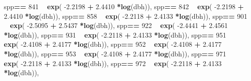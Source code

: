 \documentclass[
]{article}
\newenvironment{Shaded}{\begin{snugshade}}{\end{snugshade}}
\newcommand{\DecValTok}[1]{\textcolor[rgb]{0.00,0.00,0.81}{#1}}
\newcommand{\FloatTok}[1]{\textcolor[rgb]{0.00,0.00,0.81}{#1}}
\newcommand{\KeywordTok}[1]{\textcolor[rgb]{0.13,0.29,0.53}{\textbf{#1}}}
\newcommand{\NormalTok}[1]{#1}
\newcommand{\OperatorTok}[1]{\textcolor[rgb]{0.81,0.36,0.00}{\textbf{#1}}}
\newcommand{\StringTok}[1]{\textcolor[rgb]{0.31,0.60,0.02}{#1}}
\begin{document}
\begin{Shaded}
\begin{Highlighting}[]
\NormalTok{    spp}\OperatorTok{==}\StringTok{ }\DecValTok{841} \OperatorTok{~}\StringTok{ }\KeywordTok{exp}\NormalTok{( }\FloatTok{-2.2198}   \OperatorTok{+}\StringTok{    }\FloatTok{2.4410} \OperatorTok{*}\KeywordTok{log}\NormalTok{(dbh)),}
\NormalTok{    spp}\OperatorTok{==}\StringTok{ }\DecValTok{842} \OperatorTok{~}\StringTok{ }\KeywordTok{exp}\NormalTok{( }\FloatTok{-2.2198}   \OperatorTok{+}\StringTok{    }\FloatTok{2.4410} \OperatorTok{*}\KeywordTok{log}\NormalTok{(dbh)),}
\NormalTok{    spp}\OperatorTok{==}\StringTok{ }\DecValTok{858} \OperatorTok{~}\StringTok{ }\KeywordTok{exp}\NormalTok{( }\FloatTok{-2.2118}   \OperatorTok{+}\StringTok{    }\FloatTok{2.4133} \OperatorTok{*}\KeywordTok{log}\NormalTok{(dbh)),}
\NormalTok{    spp}\OperatorTok{==}\StringTok{ }\DecValTok{901} \OperatorTok{~}\StringTok{ }\KeywordTok{exp}\NormalTok{( }\FloatTok{-2.5095}   \OperatorTok{+}\StringTok{    }\FloatTok{2.5437} \OperatorTok{*}\KeywordTok{log}\NormalTok{(dbh)),}
\NormalTok{    spp}\OperatorTok{==}\StringTok{ }\DecValTok{922} \OperatorTok{~}\StringTok{ }\KeywordTok{exp}\NormalTok{( }\FloatTok{-2.4441}   \OperatorTok{+}\StringTok{    }\FloatTok{2.4561} \OperatorTok{*}\KeywordTok{log}\NormalTok{(dbh)),}
\NormalTok{    spp}\OperatorTok{==}\StringTok{ }\DecValTok{931} \OperatorTok{~}\StringTok{ }\KeywordTok{exp}\NormalTok{( }\FloatTok{-2.2118}   \OperatorTok{+}\StringTok{    }\FloatTok{2.4133} \OperatorTok{*}\KeywordTok{log}\NormalTok{(dbh)),}
\NormalTok{    spp}\OperatorTok{==}\StringTok{ }\DecValTok{951} \OperatorTok{~}\StringTok{ }\KeywordTok{exp}\NormalTok{( }\FloatTok{-2.4108}   \OperatorTok{+}\StringTok{    }\FloatTok{2.4177} \OperatorTok{*}\KeywordTok{log}\NormalTok{(dbh)),}
\NormalTok{    spp}\OperatorTok{==}\StringTok{ }\DecValTok{952} \OperatorTok{~}\StringTok{ }\KeywordTok{exp}\NormalTok{( }\FloatTok{-2.4108}   \OperatorTok{+}\StringTok{    }\FloatTok{2.4177} \OperatorTok{*}\KeywordTok{log}\NormalTok{(dbh)),}
\NormalTok{    spp}\OperatorTok{==}\StringTok{ }\DecValTok{953} \OperatorTok{~}\StringTok{ }\KeywordTok{exp}\NormalTok{( }\FloatTok{-2.4108}   \OperatorTok{+}\StringTok{    }\FloatTok{2.4177} \OperatorTok{*}\KeywordTok{log}\NormalTok{(dbh)),}
\NormalTok{    spp}\OperatorTok{==}\StringTok{ }\DecValTok{971} \OperatorTok{~}\StringTok{ }\KeywordTok{exp}\NormalTok{( }\FloatTok{-2.2118}   \OperatorTok{+}\StringTok{    }\FloatTok{2.4133} \OperatorTok{*}\KeywordTok{log}\NormalTok{(dbh)),}
\NormalTok{    spp}\OperatorTok{==}\StringTok{ }\DecValTok{972} \OperatorTok{~}\StringTok{ }\KeywordTok{exp}\NormalTok{( }\FloatTok{-2.2118}   \OperatorTok{+}\StringTok{    }\FloatTok{2.4133} \OperatorTok{*}\KeywordTok{log}\NormalTok{(dbh)),}

\end{Highlighting}
\end{Shaded}
\end{document}
